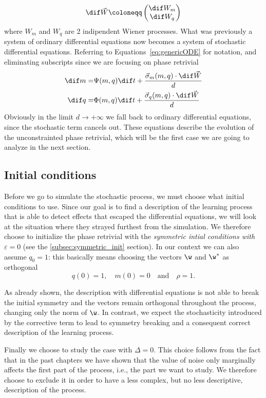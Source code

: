 \[
  \dif \vec{W} \coloneqq 
  \begin{pmatrix}
    \dif W_m \\
    \dif W_q
  \end{pmatrix}
\]
where \(W_m\) and \(W_q\) are 2 indipendent Wiener processes.
What was previously a system of ordinary differential equations now becomes a system of stochastic differential equations.
Referring to Equations~\eqref{eq:genericODE} for notation, and eliminating subscripts since we are focusing on phase retrivial
\begin{subequations}\begin{align}
  \dif m =& \Psi{(m,q)}\dif t + \frac{\vec{\sigma}_m{(m,q)}\cdot\dif \vec{W}}{d} \\
  \dif q =& \Phi{(m,q)}\dif t + \frac{\vec{\sigma}_q{(m,q)}\cdot\dif \vec{W}}{d} 
\end{align}\end{subequations}
Obviously in the limit \(d\to+\infty\) we fall back to ordinary differential equations,
since the stochastic term cancels out.
These equations describe the evolution of the unconstrainted phase retrivial,
which will be the first case we are going to analyze in the next section.

\subsection{Initial conditions}
Before we go to simulate the stochastic process, we must choose what initial conditions to use.
Since our goal is to find a description of the learning process that is able to detect effects that escaped the differential equations,
we will look at the situation where they strayed furthest from the simulation. 
We therefore choose to initialize the phase retrivial with the \emph{symmetric intial conditions with \(\varepsilon = 0\)} (see the \ref{subsec:symmetric_init} section).
In our context we can also assume \(q_0 = 1\): this basically means choosing the vectors \(\w\) and \(\w^*\) as orthogonal
\[
  q(0) = 1, \quad m(0) = 0 \quad\text{and}\quad\rho=1.
\]

As already shown, the description with differential equations is not able to break the initial symmetry and the vectors remain orthogonal throughout the process,
changing only the norm of \(\w\).
In contrast, we expect the stochasticity introduced by the corrective term to lead to symmetry breaking and a consequent correct description of the learning process.

Finally we choose to study the case with \(\Delta=0\). 
This choice follows from the fact that in the past chapters we have shown that the value of noise only marginally affects the first part of the process,
i.e., the part we want to study. We therefore choose to exclude it in order to have a less complex,
but no less descriptive, description of the process.


